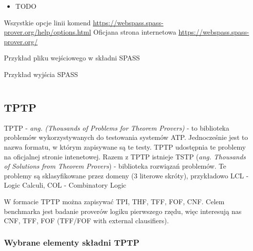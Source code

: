 \documentclass[a4paper,12pt]{article}
\newenvironment{longlisting}{\captionsetup{type=listing}}{}
\begin{document}
\begin{itemize}
  \item TODO
\end{itemize}

\noindent
Wszystkie opcje linii komend \url{https://webspass.spass-prover.org/help/options.html}
\noindent \newline
Oficjana strona internetowa \url{https://webspass.spass-prover.org/}

\begin{longlisting}
  \caption{Przykład pliku wejściowego w składni SPASS}
\end{longlisting}

\begin{longlisting}
  \caption{Przykład wyjścia SPASS}
  \inputminted{text}{listings/spass_example.out}
\end{longlisting}

\subsection{TPTP}

TPTP - \textit{ang. (Thousands of Problems for Theorem Provers)} - to biblioteka problemów wykorzystywanych do testowania systemów \gls{ATP}. Jednocześnie jest to nazwa formatu, w którym zapisywane są te testy. TPTP udostępnia te problemy na oficjalnej stronie intenetowej. Razem z TPTP istnieje TSTP (\textit{ang. Thousands of Solutions from Theorem Provers}) - biblioteka rozwiązań problemów.
Te problemy są sklasyfikowane przez domeny (3 literowe skróty), przykładowo LCL - Logic Calculi, COL - Combinatory Logic

W formacie TPTP można zapisywać \gls{TPI}, \gls{THF}, \gls{TFF}, \gls{FOF}, \gls{CNF}. Celem benchmarka jest badanie proverów logiku pierwszego rzędu, więc interesują nas \gls{CNF}, \gls{TFF}, \gls{FOF} (TFF/FOF with external clausifiers).

\subsubsection{Wybrane elementy składni TPTP}
\end{document}
